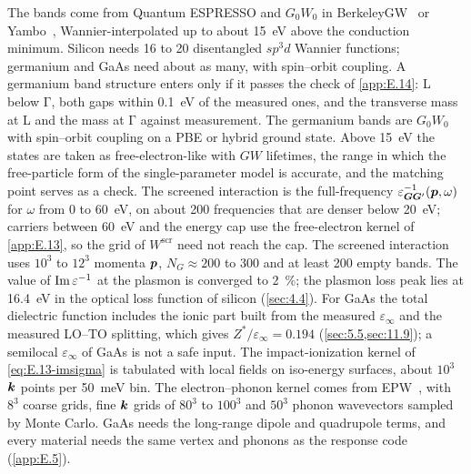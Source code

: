 The bands come from Quantum ESPRESSO and $G_0W_0$ in BerkeleyGW~\cite{deslippe2012berkeleygw} or Yambo~\cite{sangalli2019many}, Wannier-interpolated up to about \SI{15}{eV} above the conduction minimum. Silicon needs 16 to 20 disentangled $sp^3d$ Wannier functions; germanium and GaAs need about as many, with spin--orbit coupling. A germanium band structure enters only if it passes the check of \cref{app:E.14}: L below $\mathrm{\Gamma}$, both gaps within \SI{0.1}{eV} of the measured ones, and the transverse mass at L and the mass at $\mathrm{\Gamma}$ against measurement. The germanium bands are $G_0W_0$ with spin--orbit coupling on a PBE or hybrid ground state. Above \SI{15}{eV} the states are taken as free-electron-like with $GW$ lifetimes, the range in which the free-particle form of the single-parameter model is accurate, and the matching point serves as a check. The screened interaction is the full-frequency $\varepsilon^{-1}_{\bm{G}\bm{G}'}(\bm{p}, \omega)$ for $\omega$ from 0 to \SI{60}{eV}, on about 200 frequencies that are denser below \SI{20}{eV}; carriers between \SI{60}{eV} and the energy cap use the free-electron kernel of \cref{app:E.13}, so the grid of $W^{\mathrm{scr}}$ need not reach the cap. The screened interaction uses $10^3$ to $12^3$ momenta $\bm{p}$, $N_G \approx 200$ to 300 and at least 200 empty bands. The value of $\operatorname{Im}\varepsilon^{-1}$ at the plasmon is converged to \SI{2}{\percent}; the plasmon loss peak lies at \SI{16.4}{eV} in the optical loss function of silicon (\cref{sec:4.4}). For GaAs the total dielectric function includes the ionic part built from the measured $\varepsilon_\infty$ and the measured LO--TO splitting, which gives $Z^*/\varepsilon_\infty = 0.194$ (\cref{sec:5.5,sec:11.9}); a semilocal $\varepsilon_\infty$ of GaAs is not a safe input. The impact-ionization kernel of \cref{eq:E.13-imsigma} is tabulated with local fields on iso-energy surfaces, about $10^3$ $\bm{k}$ points per \SI{50}{meV} bin. The electron--phonon kernel comes from EPW~\cite{ponce2016epw}, with $8^3$ coarse grids, fine $\bm{k}$ grids of $80^3$ to $100^3$ and $50^3$ phonon wavevectors sampled by Monte Carlo. GaAs needs the long-range dipole and quadrupole terms, and every material needs the same vertex and phonons as the response code (\cref{app:E.5}).

